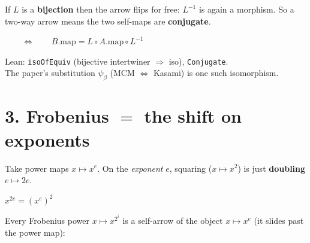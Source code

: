 \documentclass[11pt]{article}
\begin{document}
If $L$ is a \textbf{bijection} then the arrow flips for free: $L^{-1}$ is
again a morphism. So a two-way arrow means the two self-maps are
\textbf{conjugate}.

\begin{center}
$\qquad\Longleftrightarrow\qquad B.\mathrm{map}=L\circ A.\mathrm{map}\circ L^{-1}$
\end{center}

\begin{center}\small
Lean: \texttt{isoOfEquiv} (bijective intertwiner $\Rightarrow$ iso),
\texttt{Conjugate}.\\
The paper's substitution $\psi_\beta$ (MCM $\Leftrightarrow$ Kasami) is one
such isomorphism.
\end{center}

\section*{3. Frobenius $=$ the shift on exponents}

Take power maps $x\mapsto x^{e}$. On the \emph{exponent} $e$, squaring
($x\mapsto x^{2}$) is just \textbf{doubling} $e\mapsto 2e$.

\begin{center}
\qquad
$x^{2e}=(x^{e})^{2}$
\end{center}

Every Frobenius power $x\mapsto x^{2^{i}}$ is a self-arrow of the object
$x\mapsto x^{e}$ (it slides past the power map):

\begin{center}
\end{center}
\end{document}
